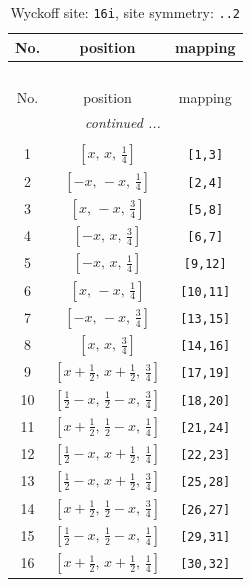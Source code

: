 \documentclass[fleqn,8pt]{jsarticle}
\begin{document}
\begin{longtable}{ccc}
\caption{Wyckoff site: {\tt 16i}, site symmetry: {\tt ..2}}
 \\
 \hline \hline
No. & position & mapping \\ \hline \endfirsthead

\multicolumn{2}{l}{\tablename\ \thetable{}} \\
 \hline \hline
No. & position & mapping \\ \hline \endhead

 \hline \hline
\multicolumn{2}{r}{\footnotesize\it continued ...} \\ \endfoot

 \hline \hline
\multicolumn{2}{r}{} \\ \endlastfoot

1 & $\left[ x,\, x,\, \frac{1}{4} \right]$ & {\tt [1,3]} \\ \hline
2 & $\left[ - x,\, - x,\, \frac{1}{4} \right]$ & {\tt [2,4]} \\ \hline
3 & $\left[ x,\, - x,\, \frac{3}{4} \right]$ & {\tt [5,8]} \\ \hline
4 & $\left[ - x,\, x,\, \frac{3}{4} \right]$ & {\tt [6,7]} \\ \hline
5 & $\left[ - x,\, x,\, \frac{1}{4} \right]$ & {\tt [9,12]} \\ \hline
6 & $\left[ x,\, - x,\, \frac{1}{4} \right]$ & {\tt [10,11]} \\ \hline
7 & $\left[ - x,\, - x,\, \frac{3}{4} \right]$ & {\tt [13,15]} \\ \hline
8 & $\left[ x,\, x,\, \frac{3}{4} \right]$ & {\tt [14,16]} \\ \hline
9 & $\left[ x + \frac{1}{2},\, x + \frac{1}{2},\, \frac{3}{4} \right]$ & {\tt [17,19]} \\ \hline
10 & $\left[ \frac{1}{2} - x,\, \frac{1}{2} - x,\, \frac{3}{4} \right]$ & {\tt [18,20]} \\ \hline
11 & $\left[ x + \frac{1}{2},\, \frac{1}{2} - x,\, \frac{1}{4} \right]$ & {\tt [21,24]} \\ \hline
12 & $\left[ \frac{1}{2} - x,\, x + \frac{1}{2},\, \frac{1}{4} \right]$ & {\tt [22,23]} \\ \hline
13 & $\left[ \frac{1}{2} - x,\, x + \frac{1}{2},\, \frac{3}{4} \right]$ & {\tt [25,28]} \\ \hline
14 & $\left[ x + \frac{1}{2},\, \frac{1}{2} - x,\, \frac{3}{4} \right]$ & {\tt [26,27]} \\ \hline
15 & $\left[ \frac{1}{2} - x,\, \frac{1}{2} - x,\, \frac{1}{4} \right]$ & {\tt [29,31]} \\ \hline
16 & $\left[ x + \frac{1}{2},\, x + \frac{1}{2},\, \frac{1}{4} \right]$ & {\tt [30,32]} \\
\end{longtable}
\end{document}
